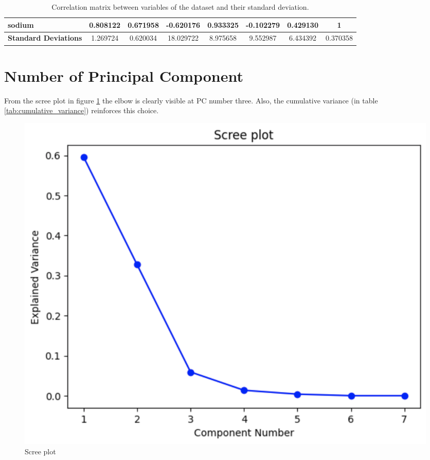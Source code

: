 \documentclass[../main.tex]{subfiles}
\begin{document}
\begin{table}[H]
{\begin{tabular}{|l|c|c|c|c|c|c|c|}
\textbf{sodium} & 0.808122                         & 0.671958                         & -0.620176                         & 0.933325                         & -0.102279                         & 0.429130                          & 1      \\ \hline \hline
\textbf{Standard Deviations} & 1.269724 & 0.620034 & 18.029722 & 8.975658 & 9.552987 & 6.434392 & 0.370358 \\ \hline
\end{tabular}%
}
\caption{Correlation matrix between variables of the dataset and their standard deviation.}
\label{tab:correlation_matrix_dataset}
\end{table}

\section{Number of Principal Component}
From the scree plot in figure \ref{fig:scree_plot} the elbow is clearly visible at PC number three. Also, the cumulative variance (in table \ref{tab:cumulative_variance}) reinforces this choice.
\begin{figure}[H]
    \centering
    \includegraphics[width=\columnwidth]{img/screePlot.png}
    \caption{Scree plot}
    \label{fig:scree_plot}
\end{figure}

\begin{table}[H]
\caption{Cumulative variances}
\label{tab:cumulative_variance}
\end{table}
\end{document}
